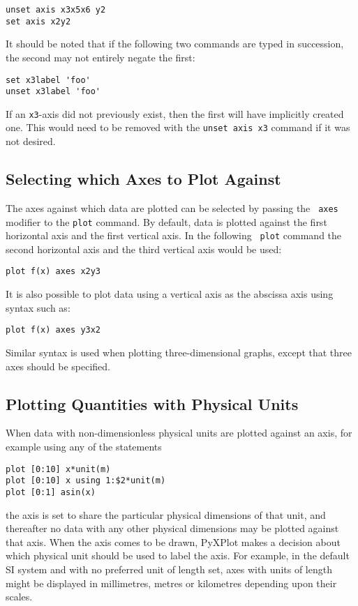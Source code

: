\begin{verbatim}
unset axis x3x5x6 y2
set axis x2y2
\end{verbatim}

It should be noted that if the following two commands are typed in succession,
the second may not entirely negate the first:

\begin{verbatim}
set x3label 'foo'
unset x3label 'foo'
\end{verbatim}

\noindent If an {\tt x3}-axis did not previously exist, then the first will
have implicitly created one. This would need to be removed with the {\tt unset
axis x3} command if it was not desired.

\subsection{Selecting which Axes to Plot Against}

The axes against which data are plotted can be selected by passing the {\tt
axes} modifier to the {\tt plot} command. By default, data is plotted against
the first horizontal axis and the first vertical axis. In the following {\tt
plot} command the second horizontal axis and the third vertical axis would be
used:
\begin{verbatim}
plot f(x) axes x2y3
\end{verbatim}
It is also possible to plot data using a vertical axis as the abscissa axis
using syntax such as:
\begin{verbatim}
plot f(x) axes y3x2
\end{verbatim}
Similar syntax is used when plotting three-dimensional graphs, except that
three axes should be specified.

\subsection{Plotting Quantities with Physical Units}
\label{sec:set_axisunitstyle}

When data with non-dimensionless physical units are plotted against an axis,
for example using any of the statements
\begin{verbatim}
plot [0:10] x*unit(m)
plot [0:10] x using 1:$2*unit(m)
plot [0:1] asin(x)
\end{verbatim}
the axis is set to share the particular physical dimensions of that unit, and
thereafter no data with any other physical dimensions may be plotted against
that axis. When the axis comes to be drawn, PyXPlot makes a decision about
which physical unit should be used to label the axis. For example, in the
default SI system and with no preferred unit of length set, axes with units of
length might be displayed in millimetres, metres or kilometres depending upon
their scales.

